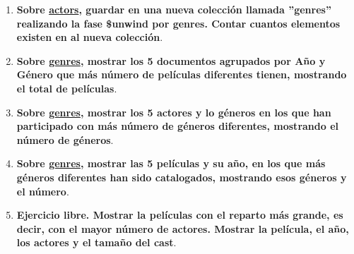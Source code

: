 \documentclass[a4paper,onecolumn]{article}
\begin{document}
\begin{sloppypar}
\begin{enumerate}
    \begin{center}
        \begin{figure}[h!]
        \end{figure}
    \end{center}
    \item \textbf{Sobre \underline{actors}, guardar en una nueva colección llamada ''genres'' realizando la fase \$unwind por genres. Contar cuantos elementos existen en al nueva colección}.
    \begin{center}
        \begin{figure}[h!]
        \end{figure}
    \end{center}
    \item \textbf{Sobre \underline{genres}, mostrar los 5 documentos agrupados por Año y Género que más número de películas diferentes tienen, mostrando el total de películas}.
    \begin{center}
        \begin{figure}[h!]
        \end{figure}
    \end{center}
    \item \textbf{Sobre \underline{genres}, mostrar los 5 actores y lo géneros en los que han participado con más número de géneros diferentes, mostrando el número de géneros}.
    \begin{center}
        \begin{figure}[h!]
        \end{figure}
    \end{center}
    \item \textbf{Sobre \underline{genres}, mostrar las 5 películas y su año, en los que más géneros diferentes han sido catalogados, mostrando esos géneros y el número}.
    \begin{center}
        \begin{figure}[h!]
        \end{figure}
    \end{center}
    \item \textbf{Ejercicio libre. Mostrar la películas con el reparto más grande, es decir, con el mayor número de actores. Mostrar la película, el año, los actores y el tamaño del cast}.
    \begin{center}
        \begin{figure}[h!]

\end{figure}
\end{center}
\end{enumerate}
\end{sloppypar}
\end{document}
